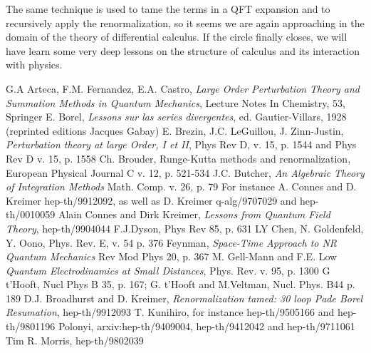 \documentclass[a4paper,a4paper]{article}
\begin{document}
The same technique is used to tame the terms in a QFT expansion and to recursively
apply the renormalization, so it seems we are again approaching in the domain of
the theory of differential calculus. If the circle finally closes, we will have learn 
some very deep lessons on the structure of calculus and its interaction with physics.



\begin{thebibliography}{30}

 G.A Arteca, F.M. Fernandez, E.A. Castro, {\it Large Order Perturbation Theory and 
Summation Methods in Quantum Mechanics}, Lecture Notes In Chemistry, 53, Springer
  E. Borel, {\it Lessons sur las series divergentes}, 
  ed. Gautier-Villars, 1928 (reprinted  editions Jacques Gabay)
  E. Brezin, J.C. LeGuillou, J. Zinn-Justin, { \it Perturbation theory at 
large Order, I et II}, Phys Rev D, v. 15, p. 1544 and Phys Rev D v. 15, p. 1558
  Ch. Brouder, {Runge-Kutta methods and renormalization}, European 
Physical Journal C v. 12, p. 521-534
 J.C. Butcher, {\it An Algebraic Theory of Integration 
                                Methods} Math. Comp. v. 26, p. 79
 For instance A. Connes and D. Kreimer hep-th/9912092, as well as D. Kreimer 
                 q-alg/9707029 and hep-th/0010059
 Alain Connes and Dirk Kreimer, {\it Lessons from Quantum Field 
   Theory}, hep-th/9904044
 F.J.Dyson, Phys Rev 85, p. 631
 LY Chen, N. Goldenfeld, Y. Oono, Phys. Rev. E, v. 54 p. 376
 Feynman, {\it Space-Time Approach to NR Quantum Mechanics} Rev Mod 
                  Phys 20, p. 367
 M. Gell-Mann and F.E. Low {\it Quantum Electrodinamics at Small Distances}, 
Phys. Rev. v. 95, p. 1300
  G t'Hooft, Nucl Phys B 35, p. 167; G. t'Hooft and M.Veltman, Nucl. Phys. B44 p. 189
 D.J. Broadhurst and D. Kreimer, {\it Renormalization tamed: 30 loop Pade Borel 
Resumation}, hep-th/9912093
  T. Kunihiro, for instance hep-th/9505166 and hep-th/9801196
 Polonyi, arxiv:hep-th/9409004, hep-th/9412042 and hep-th/9711061
 Tim R. Morris, hep-th/9802039
\end{thebibliography}
\end{document}
